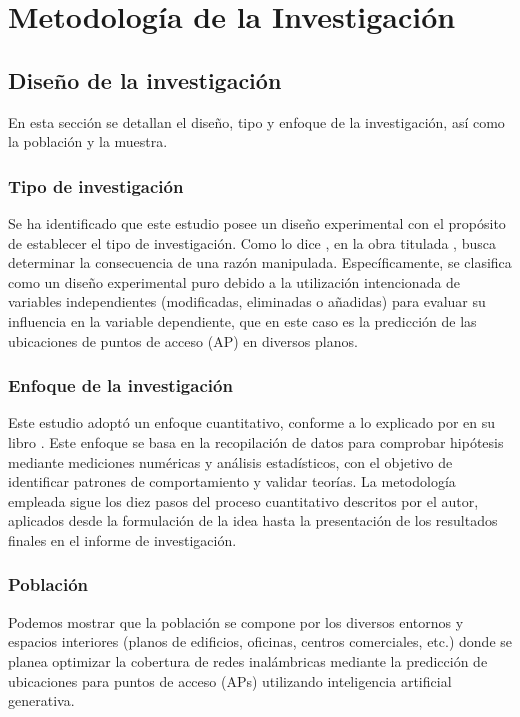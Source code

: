 \chapter{Metodología de la Investigación}
\section{Diseño de la investigación}
En esta sección se detallan el diseño, tipo y enfoque de la investigación, así como la población y la muestra.

\subsection{Tipo de investigación}
Se ha identificado que este estudio posee un diseño experimental con el propósito de establecer el tipo de investigación. Como lo dice \cite{bk_hernandez2014metodologia}, en la obra titulada , busca determinar la consecuencia de una razón manipulada. Específicamente, se clasifica como un diseño experimental puro debido a la utilización intencionada de variables independientes (modificadas, eliminadas o añadidas) para evaluar su influencia en la variable dependiente, que en este caso es la predicción de las ubicaciones de puntos de acceso (AP) en diversos planos.

\subsection{Enfoque de la investigación}
Este estudio adoptó un enfoque cuantitativo, conforme a lo explicado por \cite{bk_hernandez2014metodologia} en su libro . Este enfoque se basa en la recopilación de datos para comprobar hipótesis mediante mediciones numéricas y análisis estadísticos, con el objetivo de identificar patrones de comportamiento y validar teorías. La metodología empleada sigue los diez pasos del proceso cuantitativo descritos por el autor, aplicados desde la formulación de la idea hasta la presentación de los resultados finales en el informe de investigación.

\subsection{Población}
Podemos mostrar que la población se compone por los diversos entornos y espacios interiores (planos de edificios, oficinas, centros comerciales, etc.) donde se planea optimizar la cobertura de redes inalámbricas mediante la predicción de ubicaciones para puntos de acceso (APs) utilizando inteligencia artificial generativa.

